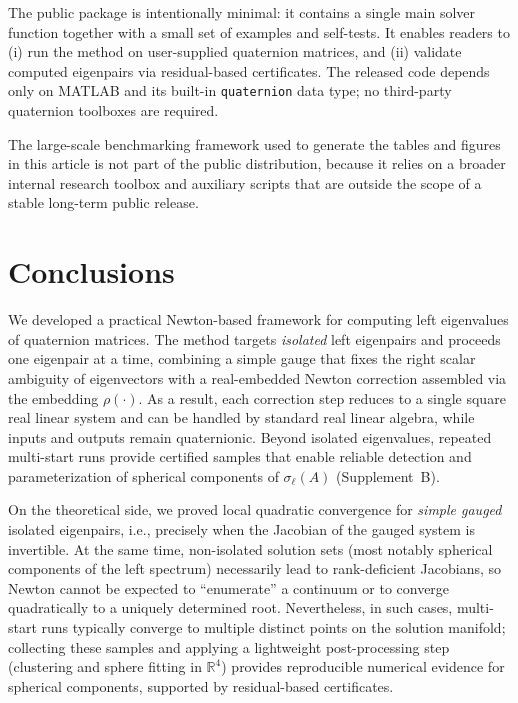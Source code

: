 \documentclass[preprint,12pt]{elsarticle}  %
\theoremstyle{definition}
\theoremstyle{definition}
\theoremstyle{definition}
\theoremstyle{definition}
\theoremstyle{definition}
\theoremstyle{remark}
\theoremstyle{remark}
\theoremstyle{remark}
\newcommand{\RR}{\mathbb{R}}
\begin{document}
The public package is intentionally minimal: it contains a single main solver function together with a small set of examples and self-tests. It enables readers to (i) run the method on user-supplied quaternion matrices, and
(ii) validate computed eigenpairs via residual-based certificates.
The released code depends only on MATLAB and its built-in \texttt{quaternion} data type; no third-party quaternion toolboxes are required.

The large-scale benchmarking framework used to generate the tables and figures in this article is not part of the public distribution, because it relies on a broader internal research toolbox and auxiliary scripts that are outside the scope of a stable long-term public release.

\section{Conclusions}
We developed a practical Newton-based framework for computing left eigenvalues of quaternion matrices.
The method targets \emph{isolated} left eigenpairs and proceeds one eigenpair at a time, combining a simple gauge that fixes the right scalar ambiguity of eigenvectors with a real-embedded Newton correction assembled via the embedding $\rho(\cdot)$.
As a result, each correction step reduces to a single square real linear system and can be handled by standard real linear algebra, while inputs and outputs remain quaternionic. Beyond isolated eigenvalues, repeated multi-start runs provide certified samples that enable reliable detection and
parameterization of spherical components of $\sigma_\ell(A)$ (Supplement~B).

On the theoretical side, we proved local quadratic convergence for \emph{simple gauged} isolated eigenpairs, i.e., precisely when the Jacobian of the gauged system is invertible. At the same time, non-isolated solution sets (most notably spherical components of the left spectrum) necessarily lead to rank-deficient Jacobians, so Newton cannot be expected to ``enumerate''
a continuum or to converge quadratically to a uniquely determined root. Nevertheless, in such cases, multi-start runs typically converge to multiple distinct points on the solution manifold; collecting these samples and applying a lightweight post-processing step (clustering and sphere fitting in $\RR^4$) provides reproducible numerical evidence for spherical
components, supported by residual-based certificates.
\end{document}
